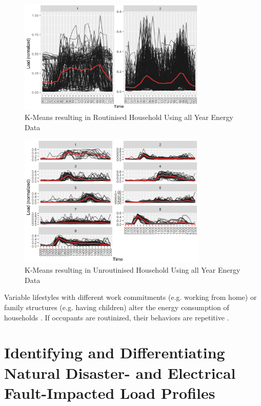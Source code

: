 \begin{figure}
    \centering
    \includegraphics[width=0.8\textwidth]{figures/malatesta_hsop/malatesta_routinisedHousehold.jpg}
    \caption{K-Means resulting in Routinised Household Using all Year Energy Data \cite{MAL-HBP}}
    \label{fig:routinized_household}
\end{figure}

\begin{figure}
    \centering
    \includegraphics[width=0.8\textwidth]{figures/malatesta_hsop/malatesta_unroutinisedHousehold.jpg}
    \caption{K-Means resulting in Unroutinised Household Using all Year Energy Data \cite{MAL-HBP}}
    \label{fig:non_routinized_household}
\end{figure}

Variable lifestyles with different work commitments (e.g. working from home) or family structures (e.g. having children) alter the energy consumption of households \cite{KUR-HBP}.
If occupants are routinized, their behaviors are repetitive \cite{BRE-EWP}.
\section{Identifying and Differentiating Natural Disaster- and Electrical Fault-Impacted Load Profiles}
\label{sec:identifying_and_differentiating_natural_disaster_and_electrical_fault_impacted_load_profiles}
